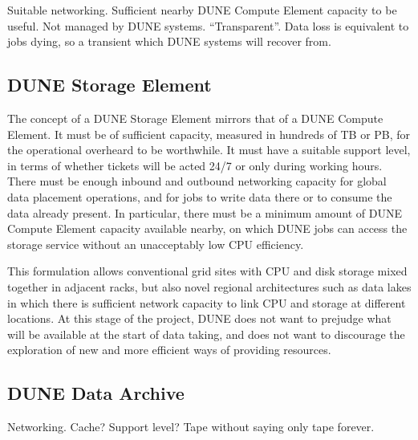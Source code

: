 Suitable networking. Sufficient nearby DUNE Compute Element capacity to be useful. Not managed by DUNE systems. ``Transparent''. Data loss is equivalent to jobs dying, so a transient which DUNE systems will recover from.

\subsection{DUNE Storage Element}
\label{sec:cm:dse}

The concept of a DUNE Storage Element mirrors that of a DUNE Compute Element. It must be of sufficient capacity, measured in hundreds of TB or PB, for the operational overheard to be worthwhile. It must have a suitable support level, in terms of whether tickets will be acted 24/7 or only during working hours. There must be enough inbound and outbound networking capacity for global data placement operations, and for jobs to write data there or to consume the data already present. In particular, there must be a minimum amount of DUNE Compute Element capacity available nearby, on which DUNE jobs can access the storage service without an unacceptably low CPU efficiency. 

This formulation allows conventional grid sites with CPU and disk storage mixed together in adjacent racks, but also novel regional architectures such as data lakes in which there is sufficient network capacity to link CPU and storage at different locations. At this stage of the project, DUNE does not want to prejudge what will be available at the start of data taking, and does not want to discourage the exploration of new and more efficient ways of providing resources.

\subsection{DUNE Data Archive}

Networking. Cache? Support level? Tape without saying only tape forever.

